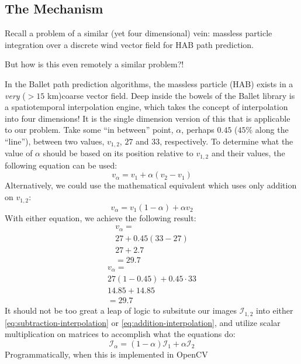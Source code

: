 \documentclass[a4paper]{article}
\begin{document}
\subsection{The Mechanism} Recall a problem of a similar (yet four dimensional) vein: massless particle integration over a discrete wind vector field for HAB path prediction.\\
\par\noindent But how is this even remotely a similar problem?!\\
\par\noindent In the Ballet path prediction algorithms, the massless particle (HAB) exists in a \textit{very} ($>15$ km)coarse vector field. Deep inside the bowels of the Ballet library is a spatiotemporal interpolation engine, which takes the concept of interpolation into four dimensions! It is the single dimension version of this that is applicable to our problem. Take some ``in between'' point, $\alpha$, perhaps $0.45$ ($45$\% along the ``line''), between two values, $v_{1,2}$, $27$ and $33$, respectively. To determine what the value of $\alpha$ should be based on its position relative to $v_{1,2}$ and their values, the following equation can be used:
\begin{equation}\label{eq:subtraction-interpolation}
  v_{\alpha} = v_{1} + \alpha\left(v_{2} - v_{1}\right)
\end{equation}
Alternatively, we could use the mathematical equivalent which uses only addition on $v_{1,2}$:
\begin{equation}\label{eq:addition-interpolation}
  v_{\alpha} = v_{1}(1-\alpha)+\alpha v_{2}
\end{equation}
With either equation, we achieve the following result:
\begin{multline}
  v_{\alpha}=\\
  27 + 0.45\left(33-27\right)\\
  27+2.7\\
  =29.7
\end{multline}
\begin{multline}
  v_{\alpha}=\\
  27\left(1-0.45\right)+0.45\cdot 33\\
  14.85+14.85\\
  =29.7
\end{multline}
It should not be too great a leap of logic to subsitute our images $\mathcal{I}_{1,2}$ into either \ref{eq:subtraction-interpolation} or \ref{eq:addition-interpolation}, and utilize scalar multiplication on matrices to accomplish what the equations do:
\begin{equation}
  \mathcal{I}_{\alpha}=\left(1-\alpha\right)\mathcal{I}_{1}+\alpha\mathcal{I}_{2}
\end{equation}
Programmatically, when this is implemented in OpenCV~\cite{opencv_library}



\end{document}
